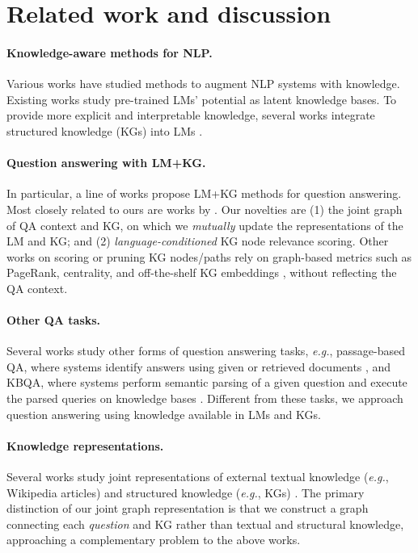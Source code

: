 \documentclass[11pt]{article}
\newcommand{\eg}{\textit{e.g.}}
\begin{document}
 \section{Related work and discussion}\label{sec:related}

\paragraph{Knowledge-aware methods for NLP.}
Various works have studied methods to augment NLP systems with knowledge.
Existing works \cite{pan2019improving,ye2019align,petroni2019language,Bosselut2019COMETCT} study pre-trained LMs' potential as latent knowledge bases. To provide more explicit and interpretable knowledge, several works integrate structured knowledge (KGs) into LMs 
\cite{mihaylov2018knowledgeable,lin2019kagnet,wang2019improving,yang2019enhancing,wang2020connecting,bosselut2021dynamic}.


\paragraph{Question answering with LM+KG.}
In particular, a line of works propose LM+KG methods for question answering. Most closely related to ours are works by \citet{lin2019kagnet,feng2020scalable,lv2020graph}. Our novelties are (1) the joint graph of QA context and KG, on which we \textit{mutually} update the representations of the LM and KG; and (2) \textit{language-conditioned} KG node relevance scoring.
Other works on scoring or pruning KG nodes/paths rely on graph-based metrics such as PageRank, centrality, and off-the-shelf KG embeddings \cite{paul2019ranking,fadnis2019heuristics,bauer2018commonsense,lin2019kagnet}, without reflecting the QA context.

\paragraph{Other QA tasks.}
Several works study other forms of question answering tasks, \eg, passage-based QA, where systems identify answers using given or retrieved documents \cite{rajpurkar2016squad,joshi2017triviaqa,yang2018hotpotqa},
and 
KBQA, where systems perform semantic parsing of a given question and execute the parsed queries on knowledge bases \citep{berant2013semantic,yih2016value,yu2018spider}.
Different from these tasks, we approach question answering using knowledge available in LMs and KGs. 


\paragraph{Knowledge representations.}
Several works study joint representations of external textual knowledge (\eg, Wikipedia articles) and structured knowledge (\eg, KGs) \cite{riedel2013relation,toutanova2015representing,xiong2019improving,sun2019pullnet,wang2019kepler}.
The primary distinction of our joint graph representation is that we construct a graph 
connecting each \textit{question} and KG rather than textual and structural knowledge, approaching a complementary problem to the above works.
\end{document}
